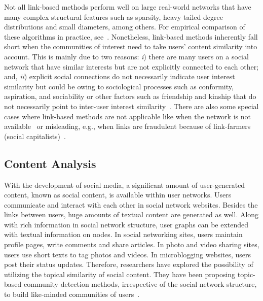 \documentclass[sigconf]{acmart}
\begin{document}
{\color{blue} Not all link-based methods perform well on large real-world networks that have many complex structural features such as sparsity, heavy tailed degree distributions and small diameters, among others. For empirical comparison of these algorithms in practice, see~\cite{DBLP:journals/pvldb/WangWYZ15, DBLP:conf/www/LeskovecLM10}. Nonetheless, link-based methods inherently fall short when the communities of interest need to take users' content similarity into account. This is mainly due to two reasons: \textit{i}) there are many users on a social network that have similar interests but are not explicitly connected to each other; and, \textit{ii}) explicit social connections do not necessarily indicate user interest similarity but could be owing to sociological processes such as conformity, aspiration, and sociability or other factors such as friendship and kinship that do not necessarily point to inter-user interest similarity~\cite{snijders2019beyond, DBLP:conf/aaai/DiehlNG07}. There are also some special cases where link-based methods are not applicable like when the network is not available~\cite{DBLP:journals/tist/BarbieriBM17} or misleading, e.g., when links are fraudulent because of link-farmers (social capitalists)~\cite{DBLP:conf/asunam/LabatutDP14}.}

\subsection{Content Analysis}
With the development of social media, a significant amount of user-generated content, known as social content, is available within user networks. Users communicate and interact with each other in social network websites. Besides the links between users, huge amounts of textual content are generated as well. Along with rich information in social network structure, user graphs can be extended with textual information on nodes. In social networking sites, users maintain profile pages, write comments and share articles. In photo and video sharing sites, users use short texts to tag photos and videos. In microblogging websites, users post their status updates. Therefore, researchers have explored the possibility of utilizing the topical similarity of social content. They have been proposing topic-based community detection methods, irrespective of the social network structure, to build like-minded communities of users~\cite{DBLP:journals/tist/BarbieriBM17, DBLP:journals/kais/LiCYZCL15, DBLP:conf/asunam/NatarajanSC13, Abdelbary6918274, DBLP:journals/tist/YinCGH12, DBLP:conf/www/SachanCFS12}.
\end{document}

